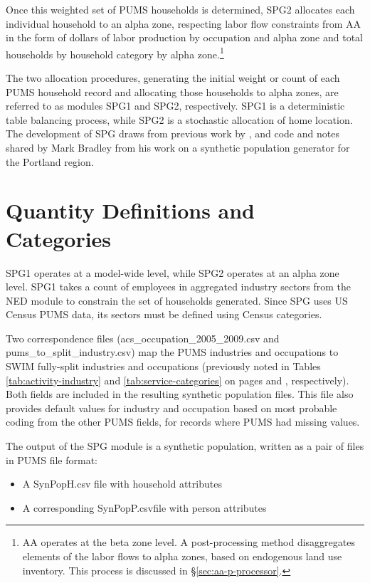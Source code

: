 Once this weighted set of PUMS households is determined, SPG2 allocates each individual household to an alpha zone, respecting labor flow constraints from AA in the form of dollars of labor production by occupation and alpha zone and total households by household category by alpha zone.\footnote{AA operates at the beta zone level. A post-processing method disaggregates elements of the labor flows to alpha zones, based on endogenous land use inventory. This process is discussed in \S\ref{sec:aa-p-processor}.}

The two allocation procedures, generating the initial weight or count of each PUMS household record and allocating those households to alpha zones, are referred to as modules SPG1 and SPG2, respectively. SPG1 is a deterministic table balancing process, while SPG2 is a stochastic allocation of home location. The development of SPG draws from previous work by \citet{beckman96}, and code and notes shared by Mark Bradley from his work on a synthetic population generator for the Portland region.

\section{Quantity Definitions and Categories}
SPG1 operates at a model-wide level, while SPG2 operates at an alpha zone level. SPG1 takes a count of employees in aggregated industry sectors from the NED module to constrain the set of households generated. Since SPG uses US Census PUMS data, its sectors must be defined using Census categories. 

Two correspondence files (acs\_occupation\_2005\_2009.csv and pums\_to\_split\_industry.csv) map the PUMS industries and occupations to SWIM fully-split industries and occupations (previously noted in Tables \ref{tab:activity-industry} and \ref{tab:service-categories} on pages \pageref{tab:activity-industry} and \pageref{tab:service-categories}, respectively). Both fields are included in the resulting synthetic population files. This file also provides default values for industry and occupation based on most probable coding from the other PUMS fields, for records where PUMS had missing values.

The output of the SPG module is a synthetic population, written as a pair of files in PUMS file format:
\begin{itemize}
\item A SynPopH.csv file with household attributes
\item A corresponding SynPopP.csvfile with person attributes
\end{itemize}

